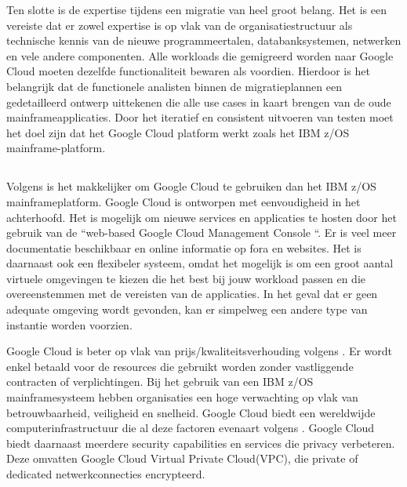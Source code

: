 Ten slotte is de expertise tijdens een migratie van heel groot belang. Het is een vereiste dat er zowel expertise is op vlak van de organisatiestructuur als technische kennis van de nieuwe programmeertalen, databanksystemen, netwerken en vele andere componenten. Alle workloads die gemigreerd worden naar Google Cloud moeten dezelfde functionaliteit bewaren als voordien. Hierdoor is het belangrijk dat de functionele analisten binnen de migratieplannen een gedetailleerd ontwerp uittekenen die alle use cases in kaart brengen van de oude mainframeapplicaties. Door het iteratief en consistent uitvoeren van testen moet het doel zijn dat het Google Cloud platform werkt zoals het IBM z/OS mainframe-platform. 

\subsection{}
\label{sec:De voordelen van migreren naar Google Cloud volgens Astadia}

Volgens \citeauthor{Astadia2021} is het makkelijker om Google Cloud te gebruiken dan het IBM z/OS mainframeplatform. Google Cloud is ontworpen met eenvoudigheid in het achterhoofd. Het is mogelijk om nieuwe services en applicaties te hosten door het gebruik van de ``web-based Google Cloud Management Console ``.  Er is veel meer documentatie beschikbaar en online informatie op fora en websites. Het is daarnaast ook een flexibeler systeem, omdat het mogelijk is om een groot aantal virtuele omgevingen te kiezen die het best bij jouw workload passen en die overeenstemmen met de vereisten van de applicaties. In het geval dat er geen adequate omgeving wordt gevonden, kan er simpelweg een andere type van instantie worden voorzien. 

Google Cloud is beter op vlak van prijs/kwaliteitsverhouding volgens \citeauthor{Astadia2021}. Er wordt enkel betaald voor de resources die gebruikt worden zonder vastliggende contracten of verplichtingen. Bij het gebruik van een IBM z/OS mainframesysteem hebben organisaties een hoge verwachting op vlak van betrouwbaarheid, veiligheid en snelheid. Google Cloud biedt een wereldwijde computerinfrastructuur die al deze factoren evenaart volgens \citeauthor{Astadia2021}. Google Cloud biedt daarnaast meerdere security capabilities en services  die privacy verbeteren. Deze omvatten Google Cloud Virtual Private Cloud(VPC), die private of dedicated netwerkconnecties encrypteerd. 

